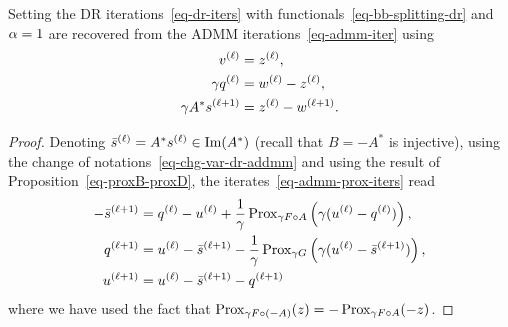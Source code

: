 \begin{prop}
	Setting
	the DR iterations~\eqref{eq-dr-iters} with functionals~\eqref{eq-bb-splitting-dr} and $\alpha=1$  are recovered from the ADMM iterations~\eqref{eq-admm-iter} using
	\begin{align*}
		   \iter{v}  &= \iter{z},\\
		\ga  \iter{q} &= \iter{w}-\iter{z}, \\
		\ga  A^* \iiter{s} &= \iter{z}-\iiter{w}.%
	\end{align*}
\end{prop}
\begin{proof}
	Denoting ${\bar s}^{(\ell)} = A^* {s}^{(\ell)} \in \text{Im}(A^*)$ (recall that $B=-A^*$ is injective), using the change of notations~\eqref{eq-chg-var-dr-addmm} and using the result of Proposition~\ref{eq-proxB-proxD}, the iterates~\eqref{eq-admm-prox-iters} read
	\begin{equation}\label{eq-equiv-iter1}
		\begin{aligned}
		-\iiter{\bar s} &=  \iter{q} - \iter{u}  + \frac{1}{\ga} \prox_{\ga F \circ A}\pa{ \ga(\iter{u}-\iter{q}) }, \\
		\iiter{q} &=  \iter{u} -\iiter{\bar s} - \frac{1}{\ga} \prox_{\ga G}\pa{ \ga( \iter{u}-\iiter{\bar s} )}, \\
		\iiter{u} &= \iter{u} - \iiter{\bar s}-  \iiter{q} 
		\end{aligned}
	\end{equation}
where we have used the fact that $\operatorname{Prox}_{\gamma F \circ (-A)}(z) =  -\operatorname{Prox}_{\gamma F \circ A}(-z)$.
%
%
%
% 

\end{proof}
